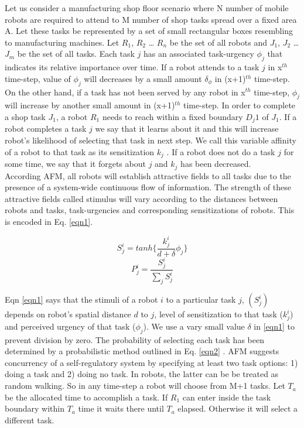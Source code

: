 \documentclass{llncs}
\begin{document}
Let us consider a manufacturing shop floor scenario where N number of mobile robots are required to attend to M number of shop tasks spread over a fixed area A. Let these tasks be represented by a set of small rectangular boxes resembling to manufacturing machines. Let $R_1$, $R_2$ … $R_n$ be the set of all robots and $J_1$, $J_2$ … $J_m$ be the set of all tasks. Each task $j$ has an associated task-urgency $\phi_j$ that indicates its relative importance over time. If a robot attends to a task $j$ in x$^{th}$ time-step, value of $\phi_j$ will decreases by a small amount $\delta_\phi$ in (x+1)$^{th}$ time-step. On the other hand, if a task has not been served by any robot in x$^{th}$ time-step, $\phi_j$ will increase by another small amount in (x+1)$^{th}$ time-step. In order to complete a shop task $J_1$, a robot $R_1$ needs to reach within a fixed boundary $D_j1$ of $J_1$. If a robot completes a task $j$ we say that it learns about it and this will increase robot's likelihood of selecting that task in next step. We call this variable affinity of a robot to that task as its sensitization $k_j$ . If a robot does not do a task $j$ for some time, we say that it forgets about $j$ and $k_j$ has been decreased.\\
According AFM, all robots will establish attractive fields to all tasks due to the presence of a system-wide continuous flow of information. The strength of these attractive fields called stimulus will vary according to the distances between robots and tasks, task-urgencies and corresponding sensitizations of robots. This is encoded in Eq. \ref{eqn1}.
\begin{small}
\begin{multicols}{2}
\begin{equation}
S_{j}^{i} = tanh\{\frac{k_{j}^{i}}{d+\delta } \phi _{j}\}
\label{eqn1}
\end{equation}
\vspace*{0.25cm}
\begin{equation}
P_{j}^{i} = \frac{S_{j}^{i}}{\sum_{j}^{}S_{j}^{i}}
\label{eqn2}
\end{equation}
\end{multicols}
\end{small}
Eqn \ref{eqn1} says that the stimuli of a robot $i$ to a particular task $j$, $(S_{j}^{i})$ depends on robot's spatial distance $d$ to $j$, level of sensitization to that task ($k_{j}^{i}$) and perceived urgency of that task ($\phi _{j}$). We use a vary small value $\delta$ in \ref{eqn1} to prevent division by zero. The probability of selecting each task has been determined by a probabilistic method outlined in Eq. \ref{eqn2} .
AFM suggests concurrency of a self-regulatory system by specifying at least two task options: 1) doing a task and 2) doing no task. In robots, the latter can be be treated as random walking. So in any time-step a robot will choose from M+1 tasks. Let $T_a$ be the allocated time to accomplish a task. If $R_1$ can enter inside the task boundary within $T_a$ time it waits there until $T_a$ elapsed. Otherwise it will select a different task.
 
\end{document}

